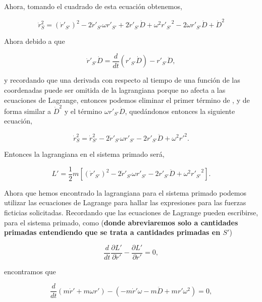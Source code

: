 \documentclass[a4paper,10pt]{article}
\numberwithin{equation}{section}
\begin{document}
Ahora, tomando el cuadrado de esta ecuación obtenemos,

\begin{equation}
 \dot{r}_S^2 = (\dot{r}'_{S'})^2 - 2 \dot{r}'_{S'}\omega r'_{S'} + 2 \dot{r}'_{S'}\dot{D} + 
 \omega^2 {r'_{S'}}^2 - 2 \omega r'_{S'}\dot{D} + \dot{D}^2
\end{equation}

Ahora debido a que 

\begin{equation}
 \dot{r}'_{S'}\dot{D} = \frac{d}{dt}(r'_{S'}\dot{D}) - r'_{S'}\ddot{D},
 \label{eq:lagrangeTeoremita}
\end{equation}

y recordando que una derivada con respecto al tiempo de una función de las coordenadas 
puede ser omitida de la lagrangiana porque no afecta a las ecuaciones de Lagrange, entonces 
podemos eliminar el primer término de , y de forma similar 
a $\dot{D}^2$ y el término $\omega r'_{S'}\dot{D}$, quedándonos entonces la siguiente ecuación,

\begin{equation}
 \dot{r}_S^2 = \dot{r}_{S'}^2 - 2 \dot{r}'_{S'}\omega r'_{S'} - 2 r'_{S'}\ddot{D}+ 
 \omega^2 r'^2.
\end{equation}

Entonces la lagrangiana en el sistema primado será,

\begin{equation}
 L' = \frac{1}{2}m [(\dot{r}'_{S'})^2 - 2 \dot{r}'_{S'}\omega r'_{S'} - 2 r'_{S'}\ddot{D}+ 
 \omega^2 {r'_{S'}}^2].
\end{equation}

Ahora que hemos encontrado la lagrangiana para el sistema primado podemos utilizar 
las ecuaciones de Lagrange para hallar las expresiones para las fuerzas ficticias 
solicitadas. Recordando que las ecuaciones de Lagrange pueden escribirse, para el 
sistema primado, como (\textbf{donde abreviaremos solo a cantidades primadas entendiendo 
que se trata a cantidades primadas en $S'$})

\begin{equation}
 \frac{d}{dt}\frac{\partial L'}{\partial \dot{r}'} - \frac{\partial L'}{\partial r'} = 0,
\end{equation}

encontramos que 

\begin{equation}
 \frac{d}{dt}(m\dot{r}' + m\omega r') - (- m \dot{r}' \omega - m\ddot{D} + mr'\omega^2) = 0,
\end{equation}
\end{document}
